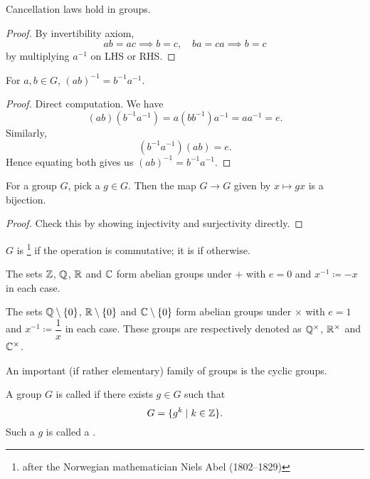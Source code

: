 \begin{proposition}
Cancellation laws hold in groups.
\end{proposition}
\begin{proof}
By invertibility axiom,
\[ ab=ac \implies b=c,\quad ba=ca\implies b=c \]
by multiplying $a^{-1}$ on LHS or RHS. 
\end{proof}

\begin{proposition}
For $a,b \in G$, $(ab)^{-1} = b^{-1}a^{-1}$.
\end{proposition}
\begin{proof}
Direct computation. We have
\[ (ab)(b^{-1}a^{-1}) = a(bb^{-1})a^{-1} = aa^{-1} = e. \]
Similarly, 
\[ (b^{-1}a^{-1})(ab) = e. \]
Hence equating both gives us $(ab)^{-1} = b^{-1}a^{-1}$.
\end{proof}

\begin{proposition}
For a group $G$, pick a $g \in G$. Then the map $G \to G$ given by $x \mapsto gx$ is a bijection.
\end{proposition}
\begin{proof}
Check this by showing injectivity and surjectivity directly.
\end{proof}

$G$ is \footnote{after the Norwegian mathematician Niels Abel (1802--1829)} if the operation is commutative; it is  if otherwise.

\begin{example}
The sets $\mathbb Z$, $\mathbb Q$, $\mathbb R$ and $\mathbb C$ form abelian groups under $+$ with $e=0$ and $x^{-1}\coloneqq-x$ in each case.
\end{example}

\begin{example}
The sets $\mathbb Q\setminus\{0\}$, $\mathbb R\setminus\{0\}$ and $\mathbb C\setminus\{0\}$ form abelian groups under $\times$ with $e=1$ and $x^{-1}\coloneqq\dfrac{1}{x}$ in each case. These groups are respectively denoted as $\mathbb Q^\times$, $\mathbb R^\times$ and $\mathbb C^\times$.
\end{example}

An important (if rather elementary) family of groups is the cyclic groups.

\begin{definition}
A group $G$ is called  if there exists $g\in G$ such that
\[ G=\{g^k\mid k\in\mathbb Z\}. \]
Such a $g$ is called a .
\end{definition}

